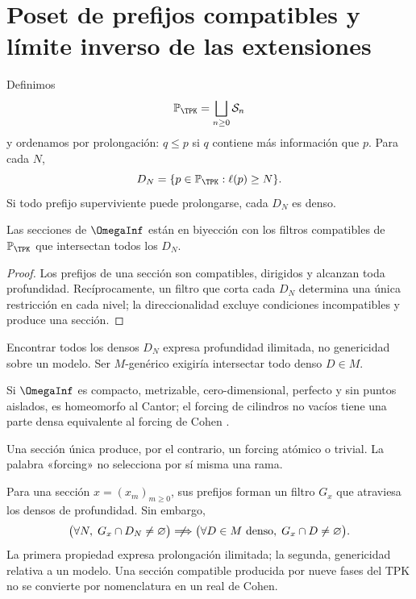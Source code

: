 \section{Poset de prefijos compatibles y límite inverso de las extensiones}

Definimos
\[
  \mathbb P_{\TPK}=\bigsqcup_{n\ge0}\mathcal S_n
\]
y ordenamos por prolongación: \(q\le p\) si \(q\) contiene más información
que \(p\). Para cada \(N\),
\[
  D_N=\{p\in\mathbb P_{\TPK}:\ell(p)\ge N\}.
\]
Si todo prefijo superviviente puede prolongarse, cada \(D_N\) es denso.

\begin{theorem}
Las secciones de \(\OmegaInf\) están en biyección con los filtros compatibles
de \(\mathbb P_{\TPK}\) que intersectan todos los \(D_N\).
\end{theorem}

\begin{proof}
Los prefijos de una sección son compatibles, dirigidos y alcanzan toda
profundidad. Recíprocamente, un filtro que corta cada \(D_N\) determina una
única restricción en cada nivel; la direccionalidad excluye condiciones
incompatibles y produce una sección.
\end{proof}

Encontrar todos los densos \(D_N\) expresa profundidad ilimitada, no
genericidad sobre un modelo. Ser \(M\)-genérico exigiría intersectar todo
denso \(D\in M\).

\begin{proposition}
Si \(\OmegaInf\) es compacto, metrizable, cero-dimensional, perfecto y sin
puntos aislados, es homeomorfo al Cantor; el forcing de cilindros no vacíos
tiene una parte densa equivalente al forcing de Cohen
\citep{cohen1963,cohen1964}.
\end{proposition}

Una sección única produce, por el contrario, un forcing atómico o trivial.
La palabra «forcing» no selecciona por sí misma una rama.

Para una sección \(x=(x_m)_{m\ge0}\), sus prefijos forman un filtro \(G_x\)
que atraviesa los densos de profundidad. Sin embargo,
\[
  \bigl(\forall N,\;G_x\cap D_N\ne\varnothing\bigr)
  \centernot\Longrightarrow
  \bigl(\forall D\in M\text{ denso},\;G_x\cap D\ne\varnothing\bigr).
\]
La primera propiedad expresa prolongación ilimitada; la segunda,
genericidad relativa a un modelo. Una sección compatible producida por
nueve fases del TPK no se convierte por nomenclatura en un real de Cohen.

